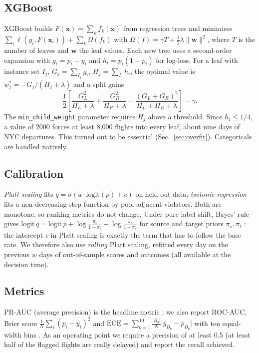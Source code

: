 \documentclass[conference]{IEEEtran}
\begin{document}
\subsection{XGBoost}
XGBoost \cite{chen2016xgboost} builds $F(\mathbf{x}) = \sum_k f_k(\mathbf{x})$ from
regression trees and minimises
$\sum_i \ell(y_i, F(\mathbf{x}_i)) + \sum_k \Omega(f_k)$ with
$\Omega(f) = \gamma T + \tfrac{1}{2}\lambda \lVert \mathbf{w} \rVert^2$, where $T$ is
the number of leaves and $\mathbf{w}$ the leaf values. Each new tree uses a
second-order expansion with $g_i = p_i - y_i$ and $h_i = p_i(1-p_i)$ for log-loss.
For a leaf with instance set $I_j$, $G_j = \sum_{I_j} g_i$, $H_j = \sum_{I_j} h_i$,
the optimal value is $w_j^* = -G_j / (H_j + \lambda)$ and a split gains
\begin{equation}
\frac{1}{2}\left[\frac{G_L^2}{H_L+\lambda} + \frac{G_R^2}{H_R+\lambda} - \frac{(G_L+G_R)^2}{H_L+H_R+\lambda}\right] - \gamma .
\end{equation}
The \texttt{min\_child\_weight} parameter requires $H_j$ above a threshold. Since
$h_i \le 1/4$, a value of 2000 forces at least 8{,}000 flights into every leaf, about
nine days of NYC departures. This turned out to be essential (Sec.~\ref{sec:overfit}).
Categoricals are handled natively.

\subsection{Calibration}
\emph{Platt scaling} fits $q = \sigma(a \cdot \mathrm{logit}(p) + c)$ on held-out data;
\emph{isotonic regression} fits a non-decreasing step function by pool-adjacent-violators.
Both are monotone, so ranking metrics do not change. Under pure label shift, Bayes' rule
gives $\mathrm{logit}\, q = \mathrm{logit}\, p + \log\frac{\pi_t}{1-\pi_t} - \log\frac{\pi_s}{1-\pi_s}$
for source and target priors $\pi_s, \pi_t$ \cite{saerens2002}: the intercept $c$ in
Platt scaling is exactly the term that has to follow the base rate. We therefore also
use \emph{rolling} Platt scaling, refitted every day on the previous $w$ days of
out-of-sample scores and outcomes (all available at the decision time).

\subsection{Metrics}
PR-AUC (average precision) is the headline metric \cite{saito2015}; we also report
ROC-AUC, Brier score $\frac{1}{N}\sum_i (p_i - y_i)^2$ and
$\mathrm{ECE} = \sum_{b=1}^{10} \frac{|B_b|}{N} \lvert \bar y_{B_b} - \bar p_{B_b}\rvert$
with ten equal-width bins \cite{guo2017calibration}. As an operating point we require a
precision of at least 0.5 (at least half of the flagged flights are really delayed) and
report the recall achieved.
\end{document}
